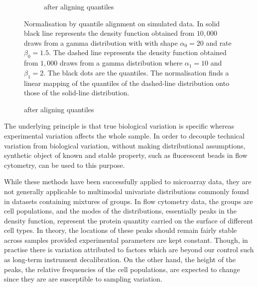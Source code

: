 \begin{figure}[h]
\begin{subfigure}[b]{.5\textwidth}
\caption{after aligning quantiles}
\end{subfigure}
{Normalisation by quantile alignment on simulated data.}
{
In solid black line represents the density function obtained from $10,000$ draws from a gamma distribution
with with shape $\alpha_0=20$ and rate $\beta_0=1.5$.
The dashed line represents the density function obtained from $1,000$ draws from a gamma distribution
where $\alpha_1=10$ and $\beta_1=2$.
The black dots are the quantiles.
The normalisation finds a linear mapping of the quantiles of the dashed-line distribution onto those of the solid-line distribution.
}
\end{figure}


The underlying principle is that true biological variation is specific whereas experimental variation affects the whole sample.
In order to decouple technical variation from biological variation, without making distributional assumptions,
synthetic object of known and stable property, such as fluorescent beads in flow cytometry, can be used to this purpose.

While these methods have been successfully applied to microarray data, they are not generally applicable
to multimodal univariate distributions commonly found in datasets containing mixtures of groups.
In flow cytometry data, the groups are cell populations, and the modes of the distributions, essentially peaks in the density function,
represent the protein quantity carried on the surface of different cell types.
In theory, the locations of these peaks should remain fairly stable across samples provided experimental parameters are kept constant.
Though, in practise there is variation attributed to factors which are beyond our control such as long-term instrument decalibration.
On the other hand, the height of the peaks, the relative frequencies of the cell populations, are expected to change since they are
are susceptible to sampling variation.

